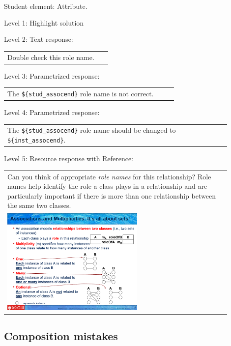 Student element: Attribute.  \medskip

\noindent Level 1: Highlight solution  \medskip

\noindent Level 2: Text response: \medskip

\begin{tabular}{|p{0.9\linewidth}}
Double check this role name.
\end{tabular} \medskip

\noindent Level 3: Parametrized response: \medskip

\begin{tabular}{|p{0.9\linewidth}}
The \verb|${stud_assocend}| role name is not correct.
\end{tabular} \medskip

\noindent Level 4: Parametrized response: \medskip

\begin{tabular}{|p{0.9\linewidth}}
The \verb|${stud_assocend}| role name should be changed to \verb|${inst_assocend}|.
\end{tabular} \medskip

\noindent Level 5: Resource response with Reference: \medskip

\begin{tabular}{|p{0.9\linewidth}}
Can you think of appropriate \textit{role names}
for this relationship? Role names help identify the role a class plays in a
relationship and are particularly important if there is more than one relationship
between the same two classes.

\\
\includegraphics[width=0.6\textwidth]{images/role_name.png}
\end{tabular} \medskip


\subsection{Composition mistakes}


